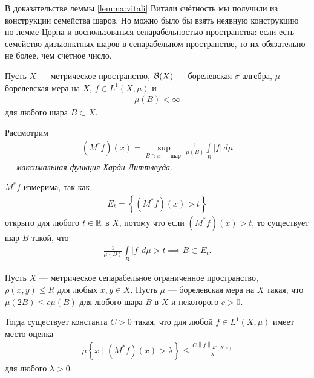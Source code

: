 \begin{remrk*}
 В доказательстве леммы \ref{lemma:vitali} Витали счётность мы получили из конструкции семейства шаров. Но можно было бы взять неявную конструкцию по лемме Цорна и воспользоваться сепарабельностью пространства: если есть семейство дизъюнктных шаров в сепарабельном пространстве, то их обязательно не более, чем счётное число.
\end{remrk*}

\begin{df}
 Пусть $X$ --- метрическое пространство, $\mathcal{B}(X)$ --- борелевская $\sigma$-алгебра, $\mu$ --- борелевская мера на $X$, $f \in L^{1}(X, \mu)$ и \begin{align*}
  \mu(B) < \infty
 \end{align*} для любого шара $B \subset X$.

 Рассмотрим 
\begin{align*}
 (M^{\ast}f)(x) = \sup_{B \ni x \text{ --- шар }} \frac{1}{\mu(B)} \int\limits_{B} \left| f \right| \, d\mu  
\end{align*} --- \textit{максимальная функция Харди-Литтлвуда}.
\end{df}
\begin{remrk}
 $M^{\ast}f$ измерима, так как \begin{align*}
  E_t = \left\{ (M^{\ast} f)(x) > t \right\} 
 \end{align*} открыто для любого $t \in \mathbb{R}$ в $X$, потому что если $(M^{\ast}f)(x) > t$, то существует шар $B$ такой, что \begin{align*}
  \frac{1}{\mu(B)} \int\limits_{B} \left| f \right| \, d\mu   >t \implies B \subset E_t
 .\end{align*} 
\end{remrk}
\begin{thm}
\label{theorem:hardy_littlewood}
 Пусть $X$ --- метрическое сепарабельное ограниченное пространство, $\rho(x, y) \leqslant R$ для любых $x,y \in X$. Пусть $\mu$ --- борелевская мера на $X$ такая, что $\mu(2B) \leqslant c \mu(B)$ для любого шара $B$ в $X$ и некоторого $c > 0$.

 Тогда существует константа $C > 0$ такая, что для любой $f \in L^{1}(X, \mu)$ имеет место оценка \begin{align*}
  \mu \left\{ x \mid (M^{\ast}f)(x) > \lambda \right\} \leqslant \frac{C \left\| f \right\|_{L'(X,\mu)}}{\lambda}
 \end{align*} для любого $\lambda > 0$.
\end{thm}
